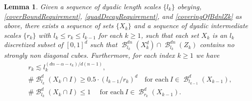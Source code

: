 \documentclass[dvipsnames,letterpaper,12pt]{article}
\numberwithin{equation}{section}
\theoremstyle{plain}
\newtheorem{lemma}{Lemma}
\theoremstyle{remark}
\DeclareMathOperator{\B}{\mathcal{B}}
\begin{document}
\begin{lemma} 
	Given a sequence of dyadic length scales $\{l_k\}$ obeying, \eqref{coverBoundRequirement}, \eqref{quadDecayRequirement}, and \eqref{coveringOfBdnlZk} as above, there exists a sequence of sets $\{X_k\}$ and a sequence of dyadic intermediate scales $\{ r_k \}$ with $l_k \leq r_k \leq l_{k-1}$ for each $k \geq 1$, such that each set $X_k$ is an $l_k$ discretized subset of $[0,1]^d$ such that $\B^{dn}_{l_k}(X_k^d) \cap \B^{dn}_{l_k}(Z_k)$ contains no strongly non diagonal cubes. Furthermore, for each index $k\geq 1$ we have
	\begin{align}
		& r_k \lesssim l_k^{(dn-\alpha -\epsilon_k)/d(n-1)},\label{rkSizeBound}\\
		& \# \B^d_{l_k}(X_k \cap I) \geq 0.5 \cdot (l_{k-1}/r_k)^d \quad \text{for each}\ I\in \B_{l_{k-1}}^d(X_{k-1}), \label{manyIkInIkm1}\\
		&\# \B^d_{l_k}(X_k \cap I) \leq 1 \quad \text{ for each}\ I \in \B_{r_{k}}^d(X_{k-1}).\label{XkWellDistributed}
	\end{align}
\end{lemma}
\end{document}

